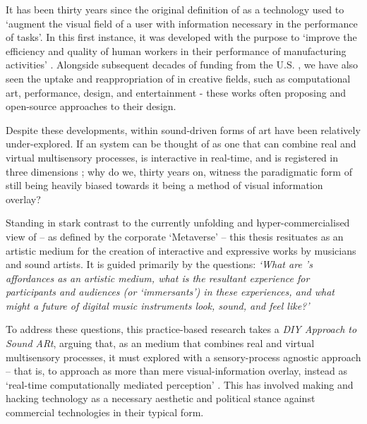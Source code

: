 \begin{SingleSpace}
    It has been thirty years since the original definition of  as a technology used to `augment the visual field of a user with information necessary in the performance of tasks'. In this first instance, it was developed with the purpose to `improve the efficiency and quality of human workers in their performance of manufacturing activities' \citep{caudell1992}. Alongside subsequent decades of funding from the U.S. , we have also seen the uptake and reappropriation of  in creative fields, such as computational art, performance, design, and entertainment - these works often proposing  and open-source approaches to their design. 

    Despite these developments,  within sound-driven forms of art have been relatively under-explored. If an  system can be thought of as one that can combine real and virtual multisensory processes, is interactive in real-time, and is registered in three dimensions \citep{azuma1997}; why do we, thirty years on, witness the paradigmatic form of  still being heavily biased \citep{billinghurst2015} towards it being a method of visual information overlay?
    
    Standing in stark contrast to the currently unfolding and hyper-commercialised view of  -- as defined by the corporate `Metaverse' -- this thesis resituates  as an artistic medium for the creation of interactive and expressive works by musicians and sound artists. It is guided primarily by the questions: \textit{`What are 's affordances as an artistic medium, what is the resultant experience for participants and audiences (or `immersants') in these experiences, and what might a future of  digital music instruments look, sound, and feel like?'}
    
    To address these questions, this practice-based research takes a \textit{DIY Approach to Sound ARt}, arguing that, as an medium that combines real and virtual multisensory processes, it must explored with a sensory-process agnostic approach -- that is, to approach  as more than mere visual-information overlay, instead as `real-time computationally mediated perception' \citep{chevalier2020}. This has involved making and hacking technology as a necessary aesthetic and political stance against commercial  technologies in their typical form.
    

\end{SingleSpace}
